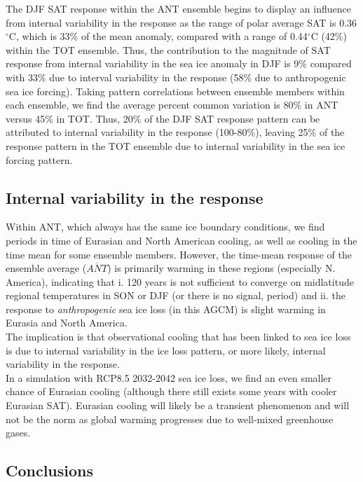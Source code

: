 \documentclass[twocol]{ametsoc}
\begin{document}
The DJF SAT response within the ANT ensemble begins to display an influence from internal variability in the response as the range of polar average SAT is 0.36$^\circ$C, which is 33\% of the mean anomaly, compared with a range of 0.44$^\circ$C (42\%) within the TOT ensemble. Thus, the contribution to the magnitude of SAT response from internal variability in the sea ice anomaly in DJF is 9\% compared with 33\% due to interval variability in the response (58\% due to anthropogenic sea ice forcing). Taking pattern correlations between ensemble members within each ensemble, we find the average percent common variation is 80\% in ANT versus 45\% in TOT. Thus, 20\% of the DJF SAT response pattern can be attributed to internal variability in the response (100-80\%), leaving 25\% of the response pattern in the TOT ensemble due to internal variability in the sea ice forcing pattern.

\subsection{Internal variability in the response}

Within ANT, which always has the same ice boundary conditions, we find periods in time of Eurasian and North American cooling, as well as cooling in the time mean for some ensemble members. However, the time-mean response of the ensemble average ($\overline{ANT}$) is primarily warming in these regions (especially N. America), indicating that i. 120 years is not sufficient to converge on midlatitude regional temperatures in SON or DJF (or there is no signal, period) and ii. the response to \textit{anthropogenic} sea ice loss (in this AGCM) is slight warming in Eurasia and North America. \\
The implication is that observational cooling that has been linked to sea ice loss is due to internal variability in the ice loss pattern, or more likely, internal variability in the response. \\

In a simulation with RCP8.5 2032-2042 sea ice loss, we find an even smaller chance of Eurasian cooling (although there still exists some years with cooler Eurasian SAT). Eurasian cooling will likely be a transient phenomenon and will not be the norm as global warming progresses due to well-mixed greenhouse gases. %

\subsection{Conclusions}
\end{document}
